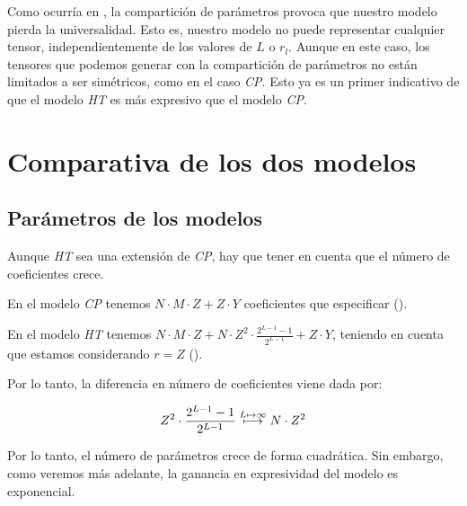 Como ocurría en , la compartición de parámetros provoca que nuestro modelo pierda la universalidad. Esto es, nuestro modelo no puede representar cualquier tensor, independientemente de los valores de $L$ o $r_l$. Aunque en este caso, los tensores que podemos generar con la compartición de parámetros no están limitados a ser simétricos, como en el caso \textit{CP}. Esto ya es un primer indicativo de que el modelo \textit{HT} es más expresivo que el modelo \textit{CP}.

\section{Comparativa de los dos modelos}

\subsection{Parámetros de los modelos}

Aunque \textit{HT} sea una extensión de \textit{CP}, hay que tener en cuenta que el número de coeficientes crece.

En el modelo \textit{CP} tenemos $N \cdot M \cdot Z + Z \cdot Y$ coeficientes que especificar ().

En el modelo \textit{HT} tenemos $N \cdot M \cdot Z + N \cdot Z^2 \cdot \frac{2^{L-1} - 1}{2^{L-1}} + Z \cdot Y$, teniendo en cuenta que estamos considerando $r = Z$ ().

Por lo tanto, la diferencia en número de coeficientes viene dada por:

\begin{equation}
    Z^2 \cdot \frac{2^{L-1} - 1}{2^{L-1}} \stackrel{L \mapsto \infty}{\longmapsto} N \cdot Z^2
\end{equation}

Por lo tanto, el número de parámetros crece de forma cuadrática. Sin embargo, como veremos más adelante, la ganancia en expresividad del modelo es exponencial.
